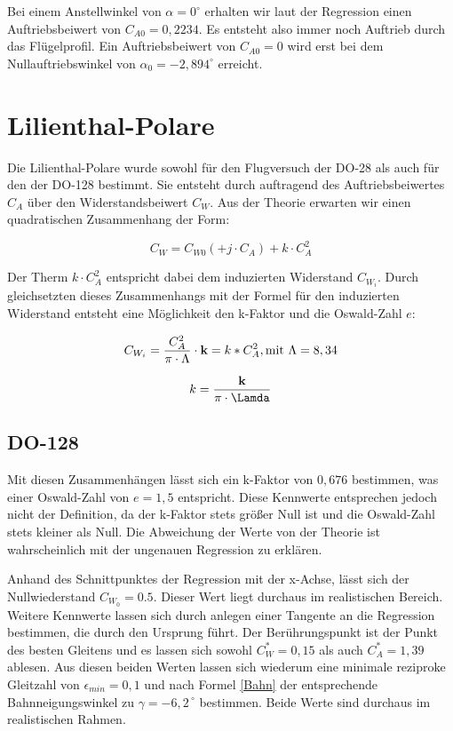 Bei einem Anstellwinkel von $\alpha = 0^{\circ}$ erhalten wir laut der Regression einen Auftriebsbeiwert von $C_{A0} = 0,2234$. Es entsteht also immer noch Auftrieb durch das Flügelprofil. 
Ein Auftriebsbeiwert von $C_{A0} = 0$ wird erst bei dem Nullauftriebswinkel von $\alpha_0 = -2,894^{\circ}$ erreicht.

\section{Lilienthal-Polare}
Die Lilienthal-Polare wurde sowohl für den Flugversuch der DO-28 als auch für den der DO-128 bestimmt. Sie entsteht durch auftragend des Auftriebsbeiwertes $C_A$ über den Widerstandsbeiwert $C_W$. 
Aus der Theorie erwarten wir einen quadratischen Zusammenhang der Form:

\begin{equation}
C_W = C_{W0} (+ j \cdot C_A) + k \cdot C_{A}^2
\end{equation}

Der Therm $k \cdot C_{A}^2$ entspricht dabei dem induzierten Widerstand $C_{W_i}$. Durch gleichsetzten dieses Zusammenhangs mit der Formel für den induzierten Widerstand entsteht eine Möglichkeit den k-Faktor und die Oswald-Zahl $e$:

\begin{equation}
C_{W_{i}}=\frac{C_A^2}{\pi \cdot \Lambda}\cdot \textbf{k}=k*C_A^2, \\ \mathrm{mit} \ \Lambda=8,34 
\label{eq:C_W_i}
\end{equation}

\begin{equation}
k = \frac{\textbf{k}}{\pi \cdot \Lamda}
\end{equation}

\subsection{DO-128}

Mit diesen Zusammenhängen lässt sich ein k-Faktor von $0,676$ bestimmen, was einer Oswald-Zahl von $e = 1,5$ entspricht. Diese Kennwerte entsprechen jedoch nicht der Definition, da der k-Faktor stets größer Null ist und die Oswald-Zahl stets kleiner als Null. Die Abweichung der Werte von der Theorie ist wahrscheinlich mit der ungenauen Regression zu erklären.

Anhand des Schnittpunktes der Regression mit der x-Achse, lässt sich der Nullwiederstand $C_W_0 = 0.5$. Dieser Wert liegt durchaus im realistischen Bereich. Weitere Kennwerte lassen sich durch anlegen einer Tangente an die Regression bestimmen, die durch den Ursprung führt. Der Berührungspunkt ist der Punkt des besten Gleitens und es lassen sich sowohl $C_W^* = 0,15$ als auch $C_A^* = 1,39$ ablesen. Aus diesen beiden Werten lassen sich wiederum eine minimale reziproke Gleitzahl von $\epsilon_{min} = 0,1$ und nach Formel \ref{Bahn} der entsprechende Bahnneigungswinkel zu $\gamma=-6,2^{\ \circ}$ bestimmen. Beide Werte sind durchaus im realistischen Rahmen.


